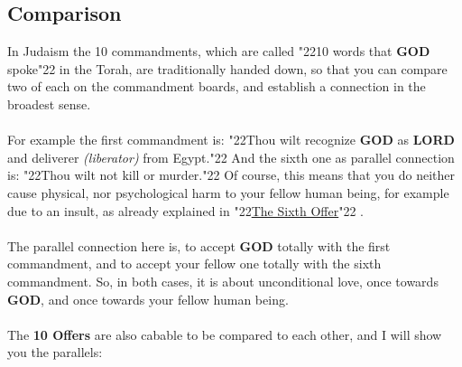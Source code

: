 \documentclass[12pt,a5paper]{article}
\newcommand{\God}[0]{\textbf{GOD}}
\newcommand{\Lord}[0]{\textbf{LORD}}
\newcommand{\q}[1]{\char"22{#1}\char"22 }
\begin{document}
	\newpage
	\subsection{Comparison}
		In Judaism the 10 commandments,
		which are called \q{10 words that {\God} spoke} in the Torah,
		are traditionally handed down,
		so that you can compare two of each on the commandment boards,
		and establish a connection in the broadest sense.
		\\
		\\
		For example the first commandment is:
		\q{Thou wilt recognize {\God} as {\Lord} and deliverer \textit{(liberator)} from Egypt.}
		And the sixth one as parallel connection is:
		\q{Thou wilt not kill or murder.}
		Of course,
		this means that you do neither cause physical,
		nor psychological harm to your fellow human being,
		for example due to an insult,
		as already explained in \q{\hyperref[TheSixthOffer]{The Sixth Offer}}.
		\\
		\\
		The parallel connection here is,
		to accept {\God} totally with the first commandment,
		and to accept your fellow one totally with the sixth commandment.
		So,
		in both cases,
		it is about unconditional love,
		once towards {\God},
		and once towards your fellow human being.
		\\
		\\
		The \textbf{10 Offers} are also cabable to be compared to each other,
		and I will show you the parallels:
		\\
\end{document}
